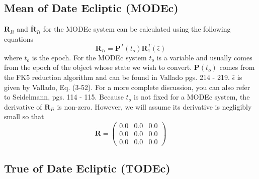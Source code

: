 {%
\subsection{Mean of Date Ecliptic (MODEc)}
\label{Sec:MODEc} 

$\mathbf{R}_{Ii}$ and $ \dot{\mathbf{R}}_{Ii}$ for the MODEc
system can be calculated using the following equations
%
\begin{equation}
      \mathbf{R}_{Ii} = \mathbf{P}^T(t_o)\mathbf{R}_1^T(\bar{\epsilon})
\end{equation}
%
where $t_o$ is the epoch.  For the MODEc system $t_o$ is a
variable and usually comes from the epoch of the object whose
state we wish to convert.   $\mathbf{P}(t_o)$ comes from the FK5
reduction algorithm and can be found in Vallado\cite{vallado2}
pgs. 214 - 219.  $\bar{\epsilon}$ is given by
Vallado\cite{vallado2}, Eq. (3-52).  For a more complete
discussion, you can also refer to Seidelmann\cite{seidelmann},
pgs. 114 - 115.   Because $t_o$ is not fixed for a MODEc system,
the derivative of $\mathbf{R}_{Ii}$ is non-zero. However, we will
assume its derivative is negligibly small so that
%
\begin{equation}
  \dot{\mathbf{R}} =   \begin{pmatrix}
     0.0 & 0.0 & 0.0\\
     0.0 & 0.0 & 0.0\\
     0.0 & 0.0 & 0.0
     \end{pmatrix}
\end{equation}

\subsection{True of Date Ecliptic (TODEc)}
\label{Sec:TODEc} 

}
